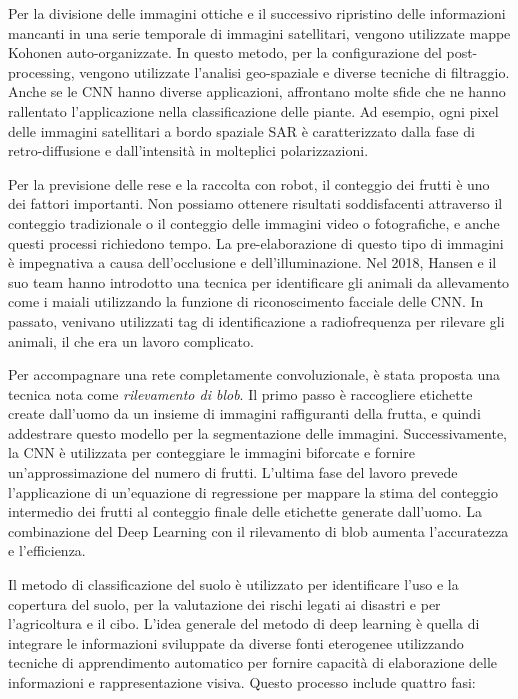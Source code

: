 Per la divisione delle immagini ottiche e il successivo ripristino delle informazioni mancanti in una serie temporale di immagini satellitari, vengono utilizzate mappe Kohonen auto-organizzate. In questo metodo, per la configurazione del post-processing, vengono utilizzate l'analisi geo-spaziale e diverse tecniche di filtraggio. Anche se le CNN hanno diverse applicazioni, affrontano molte sfide che ne hanno rallentato l'applicazione nella classificazione delle piante. Ad esempio, ogni pixel delle immagini satellitari a bordo spaziale SAR è caratterizzato dalla fase di retro-diffusione e dall'intensità in molteplici polarizzazioni.

Per la previsione delle rese e la raccolta con robot, il conteggio dei frutti è uno dei fattori importanti. Non possiamo ottenere risultati soddisfacenti attraverso il conteggio tradizionale o il conteggio delle immagini video o fotografiche, e anche questi processi richiedono tempo. La pre-elaborazione di questo tipo di immagini è impegnativa a causa dell'occlusione e dell'illuminazione. Nel 2018, Hansen e il suo team hanno introdotto una tecnica per identificare gli animali da allevamento come i maiali utilizzando la funzione di riconoscimento facciale delle CNN. In passato, venivano utilizzati tag di identificazione a radiofrequenza per rilevare gli animali, il che era un lavoro complicato.

Per accompagnare una rete completamente convoluzionale, è stata proposta una tecnica nota come \textit{rilevamento di blob}. Il primo passo è raccogliere etichette create dall'uomo da un insieme di immagini raffiguranti della frutta, e quindi addestrare questo modello per la segmentazione delle immagini. Successivamente, la CNN è utilizzata per conteggiare le immagini biforcate e fornire un'approssimazione del numero di frutti. L'ultima fase del lavoro prevede l'applicazione di un'equazione di regressione per mappare la stima del conteggio intermedio dei frutti al conteggio finale delle etichette generate dall'uomo. La combinazione del Deep Learning con il rilevamento di blob aumenta l'accuratezza e l'efficienza.

Il metodo di classificazione del suolo è utilizzato per identificare l'uso e la copertura del suolo, per la valutazione dei rischi legati ai disastri e per l'agricoltura e il cibo. L'idea generale del metodo di deep learning è quella di integrare le informazioni sviluppate da diverse fonti eterogenee utilizzando tecniche di apprendimento automatico per fornire capacità di elaborazione delle informazioni e rappresentazione visiva. Questo processo include quattro fasi: 

